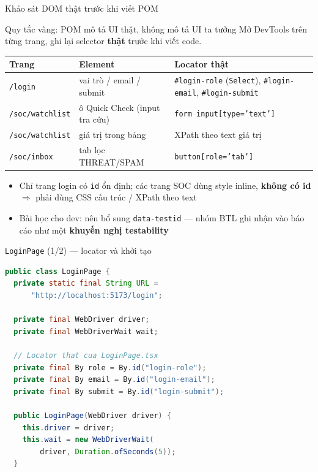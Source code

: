 \documentclass[aspectratio=169,12pt]{beamer}
\begin{document}
\begin{frame}[fragile]{Khảo sát DOM thật trước khi viết POM}
  \vspace*{-0.5em}
  \begin{alertblock}{Quy tắc vàng: POM mô tả UI thật, không mô tả UI ta tưởng}
    Mở DevTools trên từng trang, ghi lại selector \textbf{thật}
    trước khi viết code.
  \end{alertblock}

  \begin{center}
  \footnotesize
  \begin{tabular}{>{\raggedright\arraybackslash}p{3.1cm}>{\raggedright\arraybackslash}p{4.2cm}>{\raggedright\arraybackslash}p{4.0cm}}
    \toprule
    \textbf{Trang} & \textbf{Element} & \textbf{Locator thật} \\
    \midrule
    \texttt{/login} & vai trò / email / submit
      & \texttt{\#login-role} (\texttt{Select}),
        \texttt{\#login-email}, \texttt{\#login-submit} \\
    \texttt{/soc/watchlist} & ô Quick Check (input tra cứu)
      & \texttt{form input[type='text']} \\
    \texttt{/soc/watchlist} & giá trị trong bảng
      & XPath theo text giá trị \\
    \texttt{/soc/inbox} & tab lọc THREAT/SPAM
      & \texttt{button[role='tab']} \\
    \bottomrule
  \end{tabular}
  \end{center}

  \begin{itemize}
    \item Chỉ trang login có \texttt{id} ổn định; các trang SOC dùng
          style inline, \textbf{không có id} $\Rightarrow$ phải dùng
          CSS cấu trúc / XPath theo text
    \item Bài học cho dev: nên bổ sung \texttt{data-testid} ---
          nhóm BTL ghi nhận vào báo cáo như một
          \textbf{khuyến nghị testability}
  \end{itemize}
\end{frame}

\begin{frame}[fragile]{\texttt{LoginPage} (1/2) --- locator và khởi tạo}
\begin{lstlisting}[language=Java,basicstyle=\ttfamily\scriptsize]
public class LoginPage {
  private static final String URL =
      "http://localhost:5173/login";

  private final WebDriver driver;
  private final WebDriverWait wait;

  // Locator that cua LoginPage.tsx
  private final By role = By.id("login-role");
  private final By email = By.id("login-email");
  private final By submit = By.id("login-submit");

  public LoginPage(WebDriver driver) {
    this.driver = driver;
    this.wait = new WebDriverWait(
        driver, Duration.ofSeconds(5));
  }
\end{lstlisting}
\end{frame}
\end{document}
